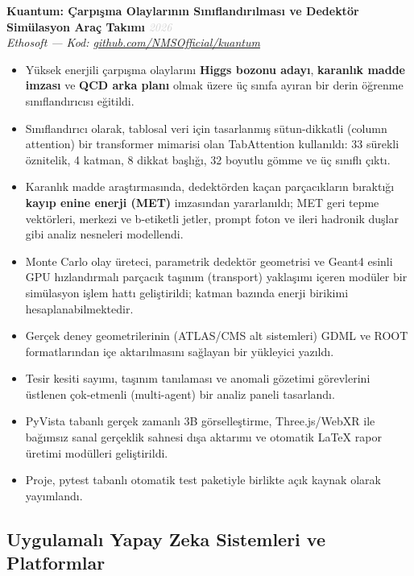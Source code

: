 \documentclass[11pt,a4paper]{article}
\newcommand{\blueitem}[1]{\textcolor{subtitleblue}{\textbf{#1}}}
\newcommand{\daterange}[1]{\hfill \textcolor{lightgray}{\textit{#1}}}
\begin{document}
\blueitem{Kuantum: Çarpışma Olaylarının Sınıflandırılması ve Dedektör Simülasyon Araç Takımı} \daterange{2026}\\
\textit{Ethosoft --- Kod: \href{https://github.com/NMSOfficial/kuantum}{github.com/NMSOfficial/kuantum}}
\begin{itemize}
    \item Yüksek enerjili çarpışma olaylarını \textbf{Higgs bozonu adayı}, \textbf{karanlık madde imzası} ve \textbf{QCD arka planı} olmak üzere üç sınıfa ayıran bir derin öğrenme sınıflandırıcısı eğitildi.
    \item Sınıflandırıcı olarak, tablosal veri için tasarlanmış sütun-dikkatli (column attention) bir transformer mimarisi olan TabAttention kullanıldı: 33 sürekli öznitelik, 4 katman, 8 dikkat başlığı, 32 boyutlu gömme ve üç sınıflı çıktı.
    \item Karanlık madde araştırmasında, dedektörden kaçan parçacıkların bıraktığı \textbf{kayıp enine enerji (MET)} imzasından yararlanıldı; MET geri tepme vektörleri, merkezi ve b-etiketli jetler, prompt foton ve ileri hadronik duşlar gibi analiz nesneleri modellendi.
    \item Monte Carlo olay üreteci, parametrik dedektör geometrisi ve Geant4 esinli GPU hızlandırmalı parçacık taşınım (transport) yaklaşımı içeren modüler bir simülasyon işlem hattı geliştirildi; katman bazında enerji birikimi hesaplanabilmektedir.
    \item Gerçek deney geometrilerinin (ATLAS/CMS alt sistemleri) GDML ve ROOT formatlarından içe aktarılmasını sağlayan bir yükleyici yazıldı.
    \item Tesir kesiti sayımı, taşınım tanılaması ve anomali gözetimi görevlerini üstlenen çok-etmenli (multi-agent) bir analiz paneli tasarlandı.
    \item PyVista tabanlı gerçek zamanlı 3B görselleştirme, Three.js/WebXR ile bağımsız sanal gerçeklik sahnesi dışa aktarımı ve otomatik \LaTeX{} rapor üretimi modülleri geliştirildi.
    \item Proje, pytest tabanlı otomatik test paketiyle birlikte açık kaynak olarak yayımlandı.
\end{itemize}

\subsection*{Uygulamalı Yapay Zeka Sistemleri ve Platformlar}
\end{document}
